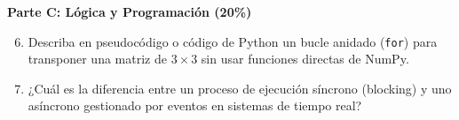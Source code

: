 \documentclass[11pt,a4paper]{article}
\begin{document}
\noindent \textbf{Parte C: Lógica y Programación (20\%)}

\begin{enumerate}
    \setcounter{enumi}{5}
    \item Describa en pseudocódigo o código de Python un bucle anidado (\texttt{for}) para transponer una matriz de $3 \times 3$ sin usar funciones directas de NumPy.
    
    \vspace{3cm}
    \item ¿Cuál es la diferencia entre un proceso de ejecución síncrono (blocking) y uno asíncrono gestionado por eventos en sistemas de tiempo real?
\end{enumerate}
\end{document}
